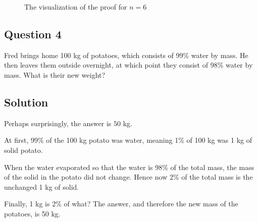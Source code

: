 \documentclass{article}
\begin{document}
\begin{figure}[htbp]
\begin{subfigure}{0.3\textwidth}
        \end{subfigure}
        \caption{The visualization of the proof for $n = 6$}
        \label{fig:my_label}
    \end{figure}

\subsection*{Question 4}
    Fred brings home 100 kg of potatoes, which consists of 99\% water by mass. He then leaves them outside overnight, at which point they consist of 98\% water by mass. What is their new weight?

\subsection*{Solution}
    Perhaps surprisingly, the answer is $50$ kg.
    
    \vspace{1.5mm}
    At first, 99\% of the 100 kg potato was water, meaning 1\% of 100 kg was 1 kg of solid potato.
    
    \vspace{1.5mm}
    When the water evaporated so that the water is 98\% of the total mass, the mass of the solid in the potato did not change. Hence now 2\% of the total mass is the unchanged 1 kg of solid.
    
    \vspace{1.5mm}
    Finally, 1 kg is 2\% of what? The answer, and therefore the new mass of the potatoes, is 50 kg.
    
\end{document}
